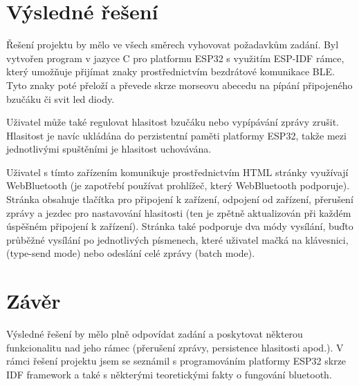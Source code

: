 \documentclass[10pt]{article}
\begin{document}
\clearpage

\section{Výsledné řešení}
\par Řešení projektu by mělo ve všech směrech vyhovovat požadavkům zadání. Byl vytvořen program v jazyce C pro platformu ESP32 s využitím ESP-IDF rámce, který umožňuje přijímat znaky prostřednictvím bezdrátové komunikace BLE. Tyto znaky poté přeloží a převede skrze morseovu abecedu na pípání připojeného bzučáku či svit led diody.
\par Uživatel může také regulovat hlasitost bzučáku nebo vypípávání zprávy zrušit. Hlasitost je navíc ukládána do perzistentní paměti platformy ESP32, takže mezi jednotlivými spuštěními je hlasitost uchovávána.
\par Uživatel s tímto zařízením komunikuje prostřednictvím HTML stránky využívají WebBluetooth (je zapotřebí používat prohlížeč, který WebBluetooth podporuje). Stránka obsahuje tlačítka pro připojení k zařízení, odpojení od zařízení, přerušení zprávy a jezdec pro nastavování hlasitosti (ten je zpětně aktualizován při každém úspěšném připojení k zařízení). Stránka také podporuje dva módy vysílání, buďto průběžné vysílání po jednotlivých písmenech, které uživatel mačká na klávesnici, (type-send mode) nebo odeslání celé zprávy (batch mode).


\section*{Závěr}
\par Výsledné řešení by mělo plně odpovídat zadání a poskytovat některou funkcionalitu nad jeho rámec (přerušení zprávy, persistence hlasitosti apod.). V rámci řešení projektu jsem se seznámil s programováním platformy ESP32 skrze IDF framework a také s některými teoretickými fakty o fungování bluetooth.

\clearpage



\end{document}
